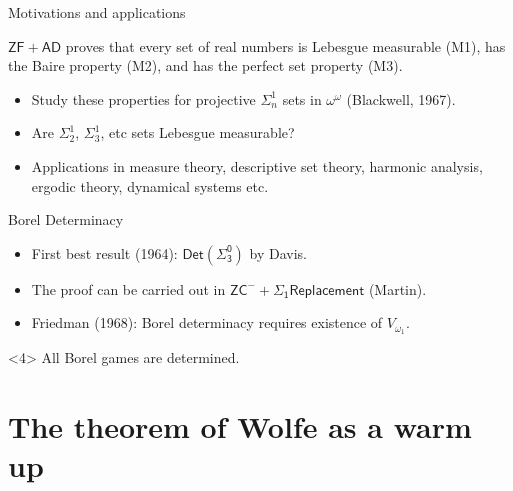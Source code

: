 \documentclass{beamer} %
\begin{document}
\begin{frame}{Motivations and applications}

    \begin{theorem}
        $\mathsf{ZF + AD}$ proves  that every set of real numbers is Lebesgue measurable (M1), has 
        the Baire property (M2), and has the perfect set property (M3).
    \end{theorem}

    \begin{itemize}
        \item<2-> Study these properties for projective $\Sigma^1_n$ sets in $\omega^{\omega}$
        (Blackwell, 1967).
        \item<3-> Are $\Sigma^1_2$, $\Sigma^1_3$, etc sets Lebesgue measurable?
        \item<4> Applications in measure theory, descriptive set theory, harmonic analysis, ergodic theory, 
        dynamical systems etc.
    \end{itemize}

\end{frame}


\begin{frame}{Borel Determinacy}
    \begin{itemize}
        \item<1-> First best result (1964): $\mathsf{Det(\Sigma^0_3)}$ by Davis.
        \item<2-> The proof can be carried out in $\mathsf{ZC^- + \Sigma_1 Replacement}$ (Martin).
        \item<3-> Friedman (1968): Borel determinacy requires existence of $V_{\omega_1}$. 
    \end{itemize}

    \begin{theorem}<4>
        All Borel games are determined.
    \end{theorem}

\end{frame}


\section{The theorem of Wolfe as a warm up}
\end{document}
